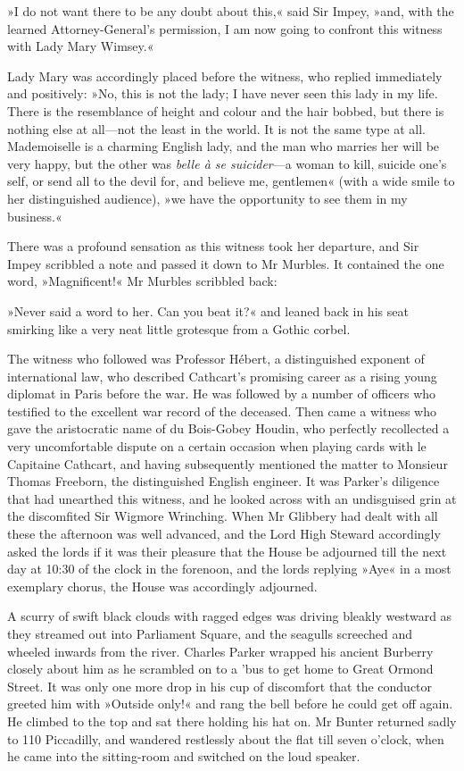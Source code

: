 »I do not want there to be any doubt about this,« said Sir Impey, »and, with the learned Attorney-General's permission, I am now going to confront this witness with Lady Mary Wimsey.«

Lady Mary was accordingly placed before the witness, who replied immediately and positively: »No, this is not the lady; I have never seen this lady in my life. There is the resemblance of height and colour and the hair bobbed, but there is nothing else at all\allowbreak---\allowbreak not the least in the world. It is not the same type at all. Mademoiselle is a charming English lady, and the man who marries her will be very happy, but the other was \textit{belle à se suicider}---a woman to kill, suicide one's self, or send all to the devil for, and believe me, gentlemen« (with a wide smile to her distinguished audience), »we have the opportunity to see them in my business.«

There was a profound sensation as this witness took her departure, and Sir Impey scribbled a note and passed it down to Mr Murbles. It contained the one word, »Magnificent!« Mr Murbles scribbled back:

»Never said a word to her. Can you beat it?« and leaned back in his seat smirking like a very neat little grotesque from a Gothic corbel.

The witness who followed was Professor Hébert, a distinguished exponent of international law, who described Cathcart's promising career as a rising young diplomat in Paris before the war. He was followed by a number of officers who testified to the excellent war record of the deceased. Then came a witness who gave the aristocratic name of du Bois-Gobey Houdin, who perfectly recollected a very uncomfortable dispute on a certain occasion when playing cards with le Capitaine Cathcart, and having subsequently mentioned the matter to Monsieur Thomas Freeborn, the distinguished English engineer. It was Parker's diligence that had unearthed this witness, and he looked across with an undisguised grin at the discomfited Sir Wigmore Wrinching. When Mr  Glibbery had dealt with all these the afternoon was well advanced, and the Lord High Steward accordingly asked the lords if it was their pleasure that the House be adjourned till the next day at 10:30 of the clock in the forenoon, and the lords replying »Aye« in a most exemplary chorus, the House was accordingly adjourned.

A scurry of swift black clouds with ragged edges was driving bleakly westward as they streamed out into Parliament Square, and the seagulls screeched and wheeled inwards from the river. Charles Parker wrapped his ancient Burberry closely about him as he scrambled on to a 'bus to get home to Great Ormond Street. It was only one more drop in his cup of discomfort that the conductor greeted him with »Outside only!« and rang the bell before he could get off again. He climbed to the top and sat there holding his hat on. Mr Bunter returned sadly to 110 Piccadilly, and wandered restlessly about the flat till seven o'clock, when he came into the sitting-room and switched on the loud speaker.

